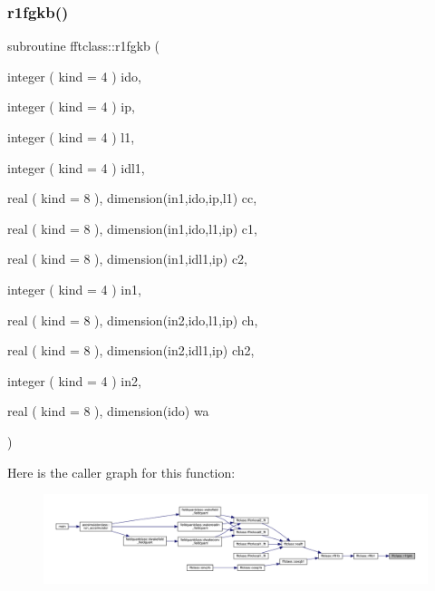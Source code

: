 \subsubsection{\texorpdfstring{r1fgkb()}{r1fgkb()}}
{\footnotesize\ttfamily subroutine fftclass\+::r1fgkb (\begin{DoxyParamCaption}\item[{integer ( kind = 4 )}]{ido,  }\item[{integer ( kind = 4 )}]{ip,  }\item[{integer ( kind = 4 )}]{l1,  }\item[{integer ( kind = 4 )}]{idl1,  }\item[{real ( kind = 8 ), dimension(in1,ido,ip,l1)}]{cc,  }\item[{real ( kind = 8 ), dimension(in1,ido,l1,ip)}]{c1,  }\item[{real ( kind = 8 ), dimension(in1,idl1,ip)}]{c2,  }\item[{integer ( kind = 4 )}]{in1,  }\item[{real ( kind = 8 ), dimension(in2,ido,l1,ip)}]{ch,  }\item[{real ( kind = 8 ), dimension(in2,idl1,ip)}]{ch2,  }\item[{integer ( kind = 4 )}]{in2,  }\item[{real ( kind = 8 ), dimension(ido)}]{wa }\end{DoxyParamCaption})}

Here is the caller graph for this function\+:\nopagebreak
\begin{figure}[H]
\begin{center}
\leavevmode
\includegraphics[width=350pt]{namespacefftclass_aa5cb9e2d3b6aa9d5adcb4144cd17f10e_icgraph}
\end{center}
\end{figure}
\mbox{\label{namespacefftclass_adb327056327448d0a605271d57091578}} 
